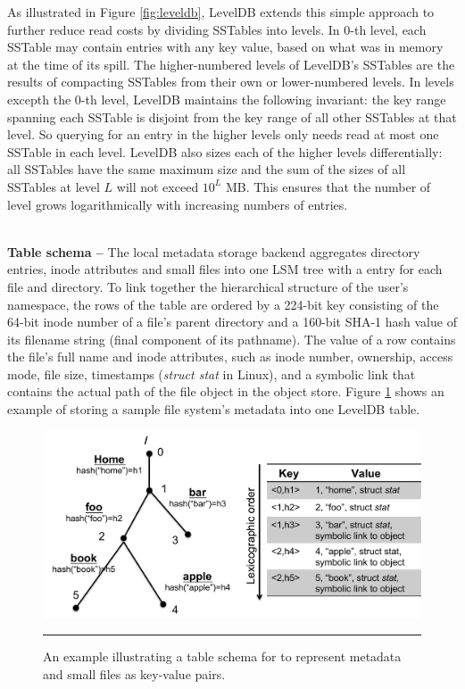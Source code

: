 As illustrated in Figure \ref{fig:leveldb},
LevelDB extends this simple approach to further
reduce read costs by dividing SSTables into levels.
In 0-th level, each SSTable may contain entries with any key value,
based on what was in memory at the time of its spill.
The higher-numbered levels of LevelDB's SSTables are
the results of compacting SSTables from their own or lower-numbered levels.
In levels excepth the 0-th level, LevelDB maintains the following invariant:
the key range spanning each SSTable is disjoint from
the key range of all other SSTables at that level.
So querying for an entry in the higher levels
only needs read at most one SSTable in each level.
LevelDB also sizes each of the higher levels differentially:
all SSTables have the same maximum size and
the sum of the sizes of all SSTables at level $L$ will not exceed $10^L$ MB.
This ensures that the number of level grows
logarithmically with increasing numbers of entries.

~\\
\textbf{Table schema -- }
The local metadata storage backend aggregates directory entries,
inode attributes and small files into one LSM tree
with a entry for each file and directory.
To link together the hierarchical structure of the user's namespace,
the rows of the table are ordered by a 224-bit key consisting of
the 64-bit inode number of a file's parent directory
and a 160-bit SHA-1 hash value of its filename string (final component of its pathname).
The value of a row contains the file's full name and inode attributes,
such as inode number, ownership, access mode, file size, timestamps (\textit{struct stat} in Linux),
and a symbolic link that contains the actual path of the file object in the object store.
Figure \ref{fig:schema} shows an example of storing a sample file system's metadata into one LevelDB table.

\begin{figure}[t]
\centering
\includegraphics[scale=0.4]{figs/schema}
\caption{\normalsize
An example illustrating a table schema for \tfs
to represent metadata and small files as key-value pairs.}
\vspace{10pt}
\hrule
\label{fig:schema}
\end{figure}

